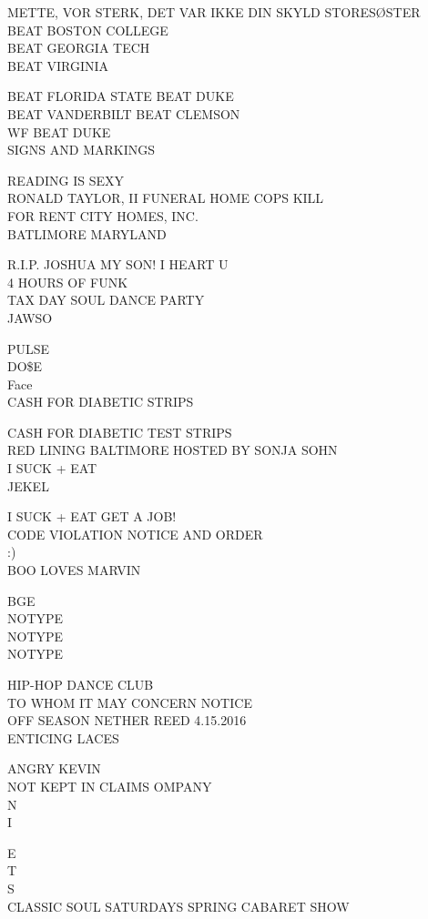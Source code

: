 \documentclass[10pt,letterpaper]{article}
\begin{document}
METTE, VOR STERK, DET VAR IKKE DIN SKYLD STORESØSTER\\
BEAT BOSTON COLLEGE\\
BEAT GEORGIA TECH\\
BEAT VIRGINIA

BEAT FLORIDA STATE BEAT DUKE\\
BEAT VANDERBILT BEAT CLEMSON\\
WF BEAT DUKE\\
SIGNS AND MARKINGS

READING IS SEXY\\
RONALD TAYLOR, II FUNERAL HOME COPS KILL\\
FOR RENT CITY HOMES, INC.\\
BATLIMORE MARYLAND

R.I.P. JOSHUA MY SON! I HEART U\\
4 HOURS OF FUNK\\
TAX DAY SOUL DANCE PARTY\\
JAWSO

PULSE\\
DO\$E\\
Face\\
CASH FOR DIABETIC STRIPS

CASH FOR DIABETIC TEST STRIPS\\
RED LINING BALTIMORE HOSTED BY SONJA SOHN\\
I SUCK + EAT\\
JEKEL

I SUCK + EAT GET A JOB!\\
CODE VIOLATION NOTICE AND ORDER\\
:)\\
BOO LOVES MARVIN

BGE\\
NOTYPE\\
NOTYPE\\
NOTYPE

HIP{-}HOP DANCE CLUB\\
TO WHOM IT MAY CONCERN NOTICE\\
OFF SEASON NETHER REED 4.15.2016\\
ENTICING LACES

ANGRY KEVIN\\
NOT KEPT IN CLAIMS OMPANY\\
N\\
I

E\\
T\\
S\\
CLASSIC SOUL SATURDAYS SPRING CABARET SHOW
\end{document}
